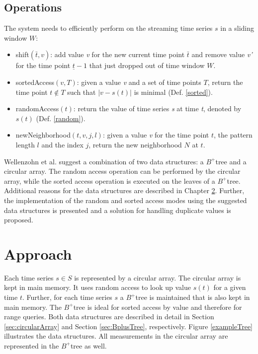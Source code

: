 \documentclass[abstracton,12pt,oneside]{scrreprt}
\begin{document}
\section{Operations}
\label{sec:Op}
The system needs to efficiently perform on the streaming time series $s$ in a sliding window $W$: 
\begin{itemize}  
	\item shift$(\bar{t}, v)$: add value \emph{v} for the new current time point $\bar{t}$ and remove value \emph{v'} for the time point $\underline{t} - 1$ that just dropped out of time window $W$.
	\item sortedAccess$(v, T)$: given a value \emph{v} and a set of time points $T$, return the time point $t \not\in T$ such that $|v-s(t)|$ is minimal (Def. \ref{sorted}).
	\item randomAccess$(t)$: return the value of time series \emph{s} at time \emph{t}, denoted by $s(t)$ (Def. \ref{random}).
	\item newNeighborhood$(t,v,j,l)$: given a value \emph{v} for the time point $t$, the pattern length $l$ and the index $j$, return the new neighborhood $N$ at $t$.
\end{itemize}
Wellenzohn et al.\cite{BScT} suggest a combination of two data structures: a $B^+$tree and a circular array. The random access operation can be performed by the circular array, while the sorted access operation is executed on the leaves of a $B^+$tree. \\Additional reasons for the data structures are described in Chapter \ref{sec:Approach}. Further, the implementation of the random and sorted access modes using the suggested data structures is presented and a solution for  handling duplicate values is proposed. 



\chapter{Approach}
\label{sec:Approach}
Each time series $s \in S$ is represented by a circular array. The circular array is kept in main memory. It uses random access to look up value $s(t)$ for a given time $t$. Further, for each time series $s$ a $B^+$tree is maintained that is also kept in main memory. The $B^+$tree is ideal for sorted access by value and therefore for range queries. Both data structures are described in detail in Section \ref{sec:circularArray} and Section \ref{sec:BplusTree}, respectively. Figure \ref{exampleTree} illustrates the data structures. All measurements in the circular array are represented in the $B^+$tree as well.
\end{document}
